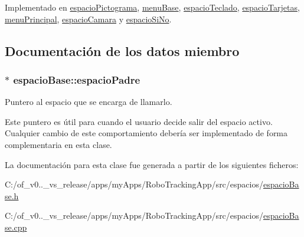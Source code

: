 Implementado en \hyperlink{classespacio_pictograma_aa6abbd78dd8a5e6e3eaa6976bc3b44ad}{espacio\+Pictograma}, \hyperlink{classmenu_base_afd9d5b3caee21605e08f3ccc387715a6}{menu\+Base}, \hyperlink{classespacio_teclado_a524ed574de9efe7be06c060c55eff416}{espacio\+Teclado}, \hyperlink{classespacio_tarjetas_a3605dfcf054ea79c7ddb3c335bac12d4}{espacio\+Tarjetas}, \hyperlink{classmenu_principal_a92b6834ff602085f79bb16f39c6a45cd}{menu\+Principal}, \hyperlink{classespacio_camara_a117e74caaada721c6501680811f9f867}{espacio\+Camara} y \hyperlink{classespacio_si_no_a07aae24ddb49581bc81bec5acd5e898c}{espacio\+Si\+No}.



\subsection{Documentación de los datos miembro}
\hypertarget{classespacio_base_aa0d870b94bfc801da7bd3015fb9ce847}{}
\subsubsection[{espacio\+Padre}]{$\ast$ espacio\+Base\+::espacio\+Padre\hspace{0.3cm}{\ttfamily [protected]}}\label{classespacio_base_aa0d870b94bfc801da7bd3015fb9ce847}


Puntero al espacio que se encarga de llamarlo. 

Este puntero es útil para cuando el usuario decide salir del espacio activo. Cualquier cambio de este comportamiento debería ser implementado de forma complementaria en esta clase. 

La documentación para esta clase fue generada a partir de los siguientes ficheros\+:\begin{DoxyCompactItemize}
\item 
C\+:/of\+\_\+v0..\+\_\+vs\+\_\+release/apps/my\+Apps/\+Robo\+Tracking\+App/src/espacios/\hyperlink{espacio_base_8h}{espacio\+Base.\+h}\item 
C\+:/of\+\_\+v0..\+\_\+vs\+\_\+release/apps/my\+Apps/\+Robo\+Tracking\+App/src/espacios/\hyperlink{espacio_base_8cpp}{espacio\+Base.\+cpp}\end{DoxyCompactItemize}
